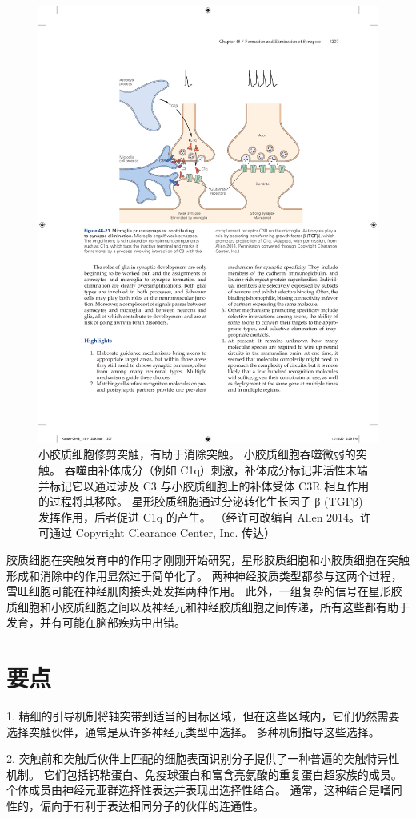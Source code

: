 \begin{figure}[htbp]
	\centering
	\includegraphics[width=0.7\linewidth]{chap48/fig_48_21}
	\caption{小胶质细胞修剪突触，有助于消除突触。 小胶质细胞吞噬微弱的突触。 吞噬由补体成分（例如 C1q）刺激，补体成分标记非活性末端并标记它以通过涉及 C3 与小胶质细胞上的补体受体 C3R 相互作用的过程将其移除。 星形胶质细胞通过分泌转化生长因子 β (TGFβ) 发挥作用，后者促进 C1q 的产生。 （经许可改编自 Allen 2014。许可通过 Copyright Clearance Center, Inc. 传达）}
	\label{fig:48_21}
\end{figure}

胶质细胞在突触发育中的作用才刚刚开始研究，星形胶质细胞和小胶质细胞在突触形成和消除中的作用显然过于简单化了。 两种神经胶质类型都参与这两个过程，雪旺细胞可能在神经肌肉接头处发挥两种作用。 此外，一组复杂的信号在星形胶质细胞和小胶质细胞之间以及神经元和神经胶质细胞之间传递，所有这些都有助于发育，并有可能在脑部疾病中出错。



\section{要点}

1. 精细的引导机制将轴突带到适当的目标区域，但在这些区域内，它们仍然需要选择突触伙伴，通常是从许多神经元类型中选择。 多种机制指导这些选择。 

2. 突触前和突触后伙伴上匹配的细胞表面识别分子提供了一种普遍的突触特异性机制。 它们包括钙粘蛋白、免疫球蛋白和富含亮氨酸的重复蛋白超家族的成员。 个体成员由神经元亚群选择性表达并表现出选择性结合。 通常，这种结合是嗜同性的，偏向于有利于表达相同分子的伙伴的连通性。 

